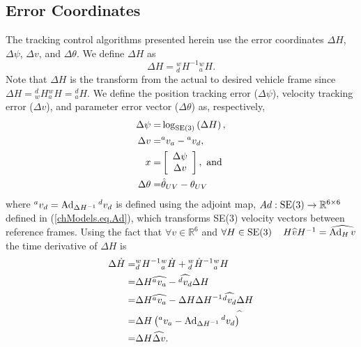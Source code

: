 

\subsection{Error Coordinates}
\label{chUV_AMBC.sec.errCoord}

The tracking control algorithms presented herein use the error
coordinates $\Delta H$, $\Delta \psi$, $\Delta v$, and $\Delta \theta$.
We define $\Delta H$ as
%
\begin{equation}
\Delta H={^w_d}H^{-1}{^w_a}H.
\end{equation}
%
Note that $\Delta H$ is the transform from the actual
  to desired vehicle frame since $\Delta H={^d_w}H{^w_a}H={^d_a}H$. 
We define the position tracking error ($\Delta
\psi$), velocity tracking error ($\Delta v$), and parameter error
vector ($\Delta \theta$) as, respectively, 
%
\begin{align}
\Delta \psi=&\log_{\SE3}\left(\Delta H \right),
\label{chUV_AMBC.eq.deltaPsi} \\
\Delta v =& {^a}v_a-{^a}v_d,
\label{chUV_AMBC.eq.deltav} \\
x=&\left[ \begin{array}{c}
     \Delta \psi           \\
     \Delta v              \\
\end{array} \right],  ~\text{and}
\label{chVU_AMBC.eq.error_x} \\
\Delta \theta =& \hat{\theta}_{UV}-\theta_{UV}
\label{chUV_AMBC.eq.deltatheta} 
\end{align}
%
where ${^a}v_d=\operatorname{Ad}_{\Delta H^{-1}}{^d}v_d$ is defined using the
adjoint map, $Ad:\SE3\to\mathbb{R}^{6 \times 6}$ defined in
(\ref{chModels.eq.Ad}), which transforms SE(3) velocity vectors
between reference frames.  Using the fact that $\forall
v\in\mathbb{R}^6$ and $\forall H\in\SE3\quad H\widehat{v}H^{-1}=\widehat{\Ad_H v}$ the time derivative of $\Delta
H$ is
%
\begin{align}
\Delta\dot{H}
  =& {^w_d}H^{-1}{^w_a}\dot{H} + {^w_d}\dot{H}^{-1}{^w_a}H  
\nonumber \\ 
  =&\Delta H \widehat{{^a}v_a} -\widehat{{^d}v_d}\Delta H   
\nonumber \\ 
  =& \Delta H\widehat{{^a}v_a} -\Delta H \Delta H^{-1}\widehat{{^d}v_d}\Delta H 
\nonumber \\ 
  =&\Delta H\left( {^a}v_a -\operatorname{Ad}_{\Delta H^{-1}}{^d}v_d\right)^{\widehat{}} 
\nonumber \\ 
  =&\Delta H\widehat{\Delta v}. 
\label{chUV_AMBC.eq.DeltaH_dot}
\end{align}
